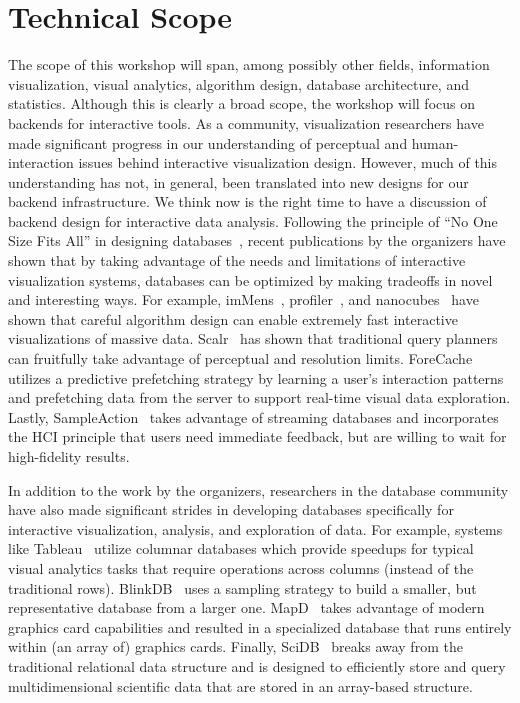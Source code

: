 \documentclass[journal]{vgtc}                %
\begin{document}
\section{Technical Scope}
The scope of this workshop will span, among possibly other fields, information visualization, visual analytics, algorithm design, database architecture, and statistics. 
Although this is clearly a broad scope, the workshop will focus on backends for interactive tools. 
As a community, visualization researchers have made significant progress in our understanding of perceptual and human-interaction issues behind interactive visualization design. 
However, much of this understanding has not, in general, been translated into new designs for our backend infrastructure. 
We think now is the right time to have a discussion of backend design for interactive data analysis. 
Following the principle of ``No One Size Fits All'' in designing databases~, recent publications by the organizers have shown that by taking advantage of the needs and limitations of interactive visualization systems, databases can be optimized by making tradeoffs in novel and interesting
ways. 
For example, imMens~, profiler~, and nanocubes~ have shown that careful algorithm design can enable extremely fast interactive visualizations of massive data. 
Scalr~ has shown that traditional query planners can fruitfully take advantage of perceptual and resolution limits. 
ForeCache~ utilizes a predictive prefetching strategy by learning a user's interaction patterns~ and prefetching data from the server to support real-time visual data exploration. 
Lastly, SampleAction~ takes advantage of streaming databases and
incorporates the HCI principle that users need immediate feedback, but are willing to wait for high-fidelity results.

In addition to the work by the organizers, researchers in the database community have also made significant strides in developing databases specifically for interactive visualization, analysis, and exploration
of data. 
For example, systems like Tableau~ utilize columnar databases which provide speedups for typical visual analytics tasks that require operations across columns (instead of the traditional rows). 
BlinkDB~ uses a sampling strategy to build a smaller, but representative database from a larger one. 
MapD~ takes advantage of modern graphics card capabilities and resulted in a specialized database that runs entirely within (an array of) graphics cards. 
Finally, SciDB~ breaks away from the traditional relational data structure and is designed to efficiently store and query multidimensional scientific data that are stored in an array-based structure. 
\end{document}
